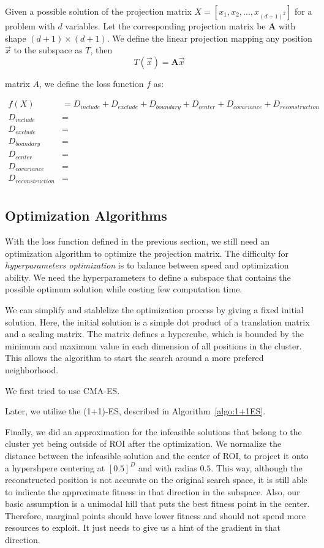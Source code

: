 Given a possible solution of the projection matrix $X = [x_1, x_2, ..., x_{(d+1)^2}]$ for a problem with $d$ variables.
Let the corresponding projection matrix be $\textbf{A}$ with shape $(d+1) \times (d+1)$.
We define the linear projection mapping any position $\vec{x}$ to the subspace as $T$, then
\begin{displaymath}
T(\vec{x}) = \textbf{A}\vec{x} 
\end{displaymath}


matrix $A$, we define the loss function $f$ as: 

\begin{align*}
f(X)                &= D_{include} + D_{exclude} + D_{boundary} + D_{center} + D_{covariance} + D_{reconstruction} \\ D_{include}         &= \\
D_{exclude}         &= \\ 
D_{boundary}        &= \\ 
D_{center}          &= \\ 
D_{covariance}      &= \\ 
D_{reconstruction}  &= \\ 
\end{align*}


\subsection{Optimization Algorithms}

With the loss function defined in the previous section, 
we still need an optimization algorithm to optimize the projection matrix.
The difficulty for \textit{hyperparameters optimization} is to balance between speed and optimization ability.
We need the hyperparameters to define a subspace that contains the possible optimum solution while costing few computation time.

We can simplify and stablelize the optimization process by giving a fixed initial solution.
Here, the initial solution is a simple dot product of a translation matrix and a scaling matrix. 
The matrix defines a hypercube, which is bounded by the minimum and maximum value in each dimension of all positions in the cluster.
This allows the algorithm to start the search around a more prefered neighborhood.

We first tried to use CMA-ES.

Later, we utilize the (1+1)-ES, described in Algorithm~\ref{algo:1+1ES}.

Finally, we did an approximation for the infeasible solutions that belong to the cluster yet being outside of ROI after the optimization.
We normalize the distance between the infeasible solution and the center of ROI,
to project it onto a hypershpere centering at $[0.5]^D$ and with radias $0.5$.
This way, although the reconstructed position is not accurate on the original search space,
it is still able to indicate the approximate fitness in that direction in the subspace.
Also, our basic assumption is a unimodal hill that puts the best fitness point in the center.
Therefore, marginal points should have lower fitness and should not spend more resources to exploit.
It just needs to give us a hint of the gradient in that direction.

